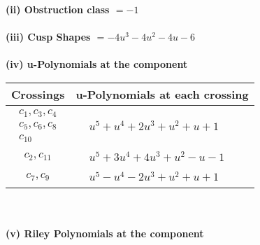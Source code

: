 \documentclass[1p]{elsarticle_modified}
\theoremstyle{definition}
\begin{document}
\flushleft \textbf{(ii) Obstruction class $= -1$}\\~\\
\flushleft \textbf{(iii) Cusp Shapes $= -4 u^3-4 u^2-4 u-6$}\\~\\
\newpage\renewcommand{\arraystretch}{1}
\flushleft \textbf{(iv) u-Polynomials at the component}\newline \\
\begin{tabular}{m{50pt}|m{274pt}}
Crossings & \hspace{64pt}u-Polynomials at each crossing \\
\hline $$\begin{aligned}c_{1},c_{3},c_{4}\\c_{5},c_{6},c_{8}\\c_{10}\end{aligned}$$&$\begin{aligned}
&u^5+u^4+2 u^3+u^2+u+1
\end{aligned}$\\
\hline $$\begin{aligned}c_{2},c_{11}\end{aligned}$$&$\begin{aligned}
&u^5+3 u^4+4 u^3+u^2- u-1
\end{aligned}$\\
\hline $$\begin{aligned}c_{7},c_{9}\end{aligned}$$&$\begin{aligned}
&u^5- u^4-2 u^3+u^2+u+1
\end{aligned}$\\
\hline
\end{tabular}\\~\\
\newpage\renewcommand{\arraystretch}{1}
\flushleft \textbf{(v) Riley Polynomials at the component}\newline \\
\end{document}
